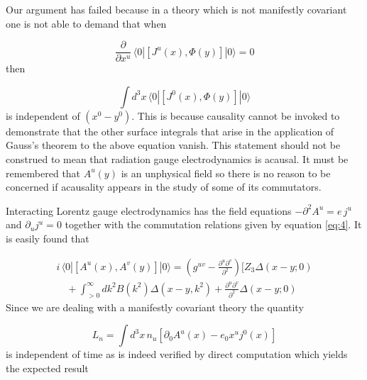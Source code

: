 \documentclass[%
  12pt,
  paper=letter,
  abstracton,
  pagesize=auto,
  version=last,
  DIV=calc
  ]{article}
\begin{document}
Our argument has failed because in a theory which is not manifestly
covariant one is not able to demand that when

\begin{equation*}
\frac{\partial}{\partial x^u}\, \langle 0|[J^u (x), \Phi (y)]|0\rangle = 0
\end{equation*}
then

\begin{equation*}
\int d^3x\, \langle 0|[J^0 (x), \Phi(y)]|0\rangle
\end{equation*}
is independent of $(x^0 - y^0)$.  This is because causality
cannot be invoked to demonstrate that the other surface integrals that
arise in the application of Gauss's theorem to the above equation
vanish.  This statement should not be construed to mean that radiation
gauge electrodynamics is acausal.  It must be remembered that $A^u
(y)$ is an unphysical field so there is no reason to be concerned if
acausality appears in the study of some of its commutators.

Interacting Lorentz gauge electrodynamics has the field
equations $-\partial^2A^u = e\, j^u$ and $\partial_uj^u=0$ together with the
commutation relations given by equation \eqref{eq:4}.  It is easily found that

\begin{multline}
\label{eq:5}
i\, \langle 0|[A^u(x), A^v(y)]|0\rangle =(g^{uv}-\frac{\partial^u \partial^v}{\partial^2})[Z_3\Delta(x-y;0) \\
\quad +\int^\infty_{>0} d k^2 B(k^2) \Delta(x-y, k^2)+\frac{\partial^u \partial^v}{\partial^2} \Delta(x-y;0)
\end{multline}
Since we are dealing with a manifestly covariant theory the quantity

\[L_n=\int d^3x\, n_u[\partial_0A^u(x)-e_0x^u j^{0}(x)]\]
is independent of time as is indeed verified by direct computation which
yields the expected result
\end{document}
